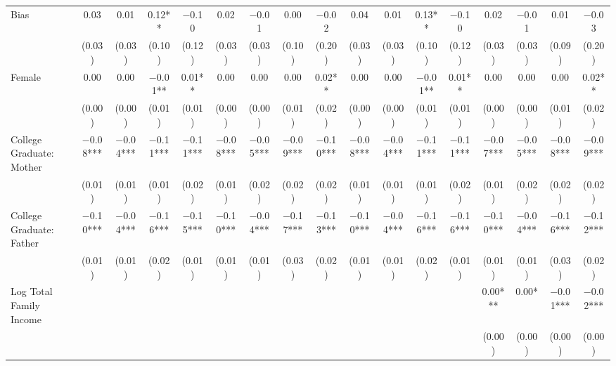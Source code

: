 \begin{landscape}
\begin{table}[!h]
{\begin{tabular}[t]{lcccccccccccccccc}
\midrule
Bias & \num{0.03} & \num{0.01} & \num{0.12}** & \num{-0.10} & \num{0.02} & \num{-0.01} & \num{0.00} & \num{-0.02} & \num{0.04} & \num{0.01} & \num{0.13}** & \num{-0.10} & \num{0.02} & \num{-0.01} & \num{0.01} & \num{-0.03}\\
 & (\num{0.03}) & (\num{0.03}) & (\num{0.10}) & (\num{0.12}) & (\num{0.03}) & (\num{0.03}) & (\num{0.10}) & (\num{0.20}) & (\num{0.03}) & (\num{0.03}) & (\num{0.10}) & (\num{0.12}) & (\num{0.03}) & (\num{0.03}) & (\num{0.09}) & (\num{0.20})\\
Female & \num{0.00} & \num{0.00} & \num{-0.01}** & \num{0.01}** & \num{0.00} & \num{0.00} & \num{0.00} & \num{0.02}** & \num{0.00} & \num{0.00} & \num{-0.01}** & \num{0.01}** & \num{0.00} & \num{0.00} & \num{0.00} & \num{0.02}**\\
 & (\num{0.00}) & (\num{0.00}) & (\num{0.01}) & (\num{0.01}) & (\num{0.00}) & (\num{0.00}) & (\num{0.01}) & (\num{0.02}) & (\num{0.00}) & (\num{0.00}) & (\num{0.01}) & (\num{0.01}) & (\num{0.00}) & (\num{0.00}) & (\num{0.01}) & (\num{0.02})\\
College Graduate: Mother & \num{-0.08}*** & \num{-0.04}*** & \num{-0.11}*** & \num{-0.11}*** & \num{-0.08}*** & \num{-0.05}*** & \num{-0.09}*** & \num{-0.10}*** & \num{-0.08}*** & \num{-0.04}*** & \num{-0.11}*** & \num{-0.11}*** & \num{-0.07}*** & \num{-0.05}*** & \num{-0.08}*** & \num{-0.09}***\\
 & (\num{0.01}) & (\num{0.01}) & (\num{0.01}) & (\num{0.02}) & (\num{0.01}) & (\num{0.02}) & (\num{0.02}) & (\num{0.02}) & (\num{0.01}) & (\num{0.01}) & (\num{0.01}) & (\num{0.02}) & (\num{0.01}) & (\num{0.02}) & (\num{0.02}) & (\num{0.02})\\
College Graduate: Father & \num{-0.10}*** & \num{-0.04}*** & \num{-0.16}*** & \num{-0.15}*** & \num{-0.10}*** & \num{-0.04}*** & \num{-0.17}*** & \num{-0.13}*** & \num{-0.10}*** & \num{-0.04}*** & \num{-0.16}*** & \num{-0.16}*** & \num{-0.10}*** & \num{-0.04}*** & \num{-0.16}*** & \num{-0.12}***\\
 & (\num{0.01}) & (\num{0.01}) & (\num{0.02}) & (\num{0.01}) & (\num{0.01}) & (\num{0.01}) & (\num{0.03}) & (\num{0.02}) & (\num{0.01}) & (\num{0.01}) & (\num{0.02}) & (\num{0.01}) & (\num{0.01}) & (\num{0.01}) & (\num{0.03}) & (\num{0.02})\\
Log Total Family Income &  &  &  &  &  &  &  &  &  &  &  &  & \num{0.00}*** & \num{0.00}* & \num{-0.01}*** & \num{-0.02}***\\
 &  &  &  &  &  &  &  &  &  &  &  &  & (\num{0.00}) & (\num{0.00}) & (\num{0.00}) & (\num{0.00})\\

\end{tabular}}
\end{table}
\end{landscape}
